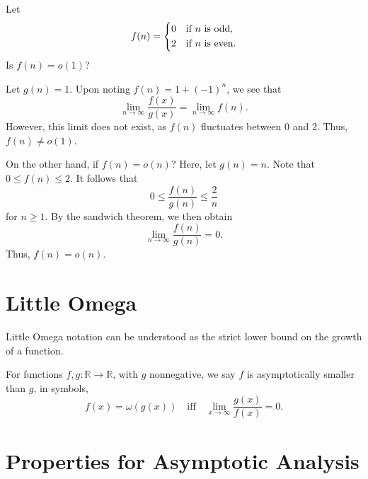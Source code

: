 \begin{eg}
Let
\[
    f(n) = \begin{dcases}
        0\quad \text{if \(n\) is odd},\\
        2\quad \text{if \(n\) is even}.
    \end{dcases}
\]
Is \(f(n) = o(1)\)?

Let \(g(n) = 1\). Upon noting \(f(n) = 1 + (-1)^n\), we see that
\[
    \lim_{n \to \infty} \dfrac{f(x)}{g(x)} = \lim_{n \to \infty} f(n).
\] 
However, this limit does not exist, as \(f(n)\) fluctuates between 0 and 2. Thus, \(f(n) \neq o(1)\).

On the other hand, if \(f(n) = o(n)\)? Here, let \(g(n) = n\). Note that \(0 \leq f(n) \leq 2\). It follows that 
\[
    0 \leq \dfrac{f(n)}{g(n)} \leq \dfrac{2}{n}
\]
for \(n \geq 1\). By the sandwich theorem, we then obtain
\[
    \lim_{n \to \infty} \dfrac{f(n)}{g(n)} = 0.
\] 
Thus, \(f(n) = o(n)\).
\end{eg}
\newpage
\section{Little Omega}
Little Omega notation can be understood as the strict lower bound on the growth of a function.

\begin{definition}
    For functions \(f, g: \mathbb{R} \to \mathbb{R}\), with \(g\) nonnegative, we say \(f\) is asymptotically smaller than \(g\), in symbols,
    \[
        f(x) = \omega (g(x))\quad\text{iff}\quad\lim_{x \to \infty} \dfrac{g(x)}{f(x)} = 0. 
    \]
\end{definition}

\section{Properties for Asymptotic Analysis}
